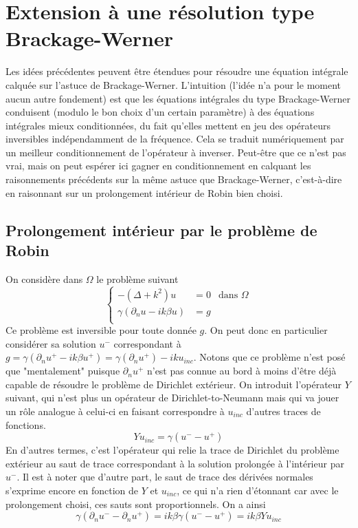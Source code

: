 \documentclass[11pt,a4paper]{article}
\begin{document}
\section{Extension à une résolution type Brackage-Werner}

Les idées précédentes peuvent être étendues pour résoudre une équation intégrale calquée sur l'astuce de Brackage-Werner. L'intuition  (l'idée n'a pour le moment aucun autre fondement) est que les équations intégrales du type Brackage-Werner conduisent (modulo le bon choix d'un certain paramètre) à des équations intégrales mieux conditionnées, du fait qu'elles mettent en jeu des opérateurs inversibles indépendamment de la fréquence. Cela se traduit numériquement par un meilleur conditionnement de l'opérateur à inverser. 
Peut-être que ce n'est pas vrai, mais on peut espérer ici gagner en conditionnement en calquant les raisonnements précédents sur la même astuce que Brackage-Werner, c'est-à-dire en raisonnant sur un prolongement intérieur de Robin bien choisi. 

\subsection{Prolongement intérieur par le problème de Robin}

On considère dans $\Omega$ le problème suivant 
\begin{equation}
\left\{
\begin{array}{rll}
-(\Delta+k^2)u &= 0 &\text{dans $\Omega$}\\
\gamma(\partial_n u -ik\beta u) &= g\\
\end{array}
\right.
\end{equation}
Ce problème est inversible pour toute donnée $g$. On peut donc en particulier considérer sa solution $u^-$ correspondant à $g = \gamma(\partial_n u^+ - ik\beta u^+) = \gamma(\partial_n u^+) - ik u_{inc}$. Notons que ce problème n'est posé que "mentalement" puisque  $\partial_n u^+$ n'est pas connue au bord à moins d'être déjà capable de résoudre le problème de Dirichlet extérieur. On introduit l'opérateur $Y$ suivant, qui n'est plus un opérateur de Dirichlet-to-Neumann mais qui va jouer un rôle analogue à celui-ci en faisant correspondre à $u_{inc}$ d'autres traces de fonctions. 
\[ Y u_{inc} = \gamma(u^--u^+) \] 
En d'autres termes, c'est l'opérateur qui relie la trace de Dirichlet du problème extérieur au saut de trace correspondant à la solution prolongée à l'intérieur par $u^-$. 
Il est à noter que d'autre part, le saut de trace des dérivées normales s'exprime encore en fonction de $Y$ et $u_{inc}$, ce qui n'a rien d'étonnant car avec le prolongement choisi, ces sauts sont proportionnels. On a ainsi
\[ \gamma(\partial_nu^--\partial_n u^+) = ik\beta \gamma(u^--u^+) = ik\beta Y u_{inc}\] 
\end{document}
